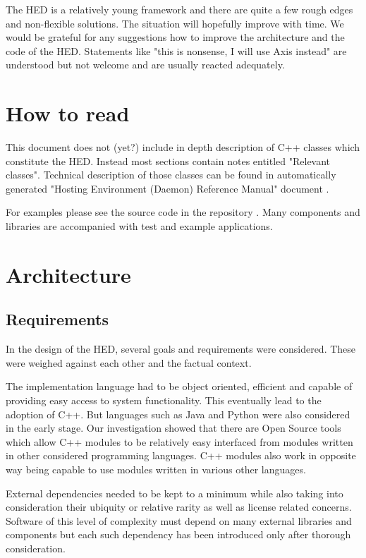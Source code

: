 \documentclass{book}
\begin{document}
The HED is a relatively young framework and there are quite a few rough edges and non-flexible solutions. The situation will hopefully improve with time. We would be grateful for any suggestions how to improve the architecture and the code of the HED. 
Statements like "this is nonsense, I will use Axis instead" are understood but not welcome and are usually reacted adequately.

\chapter{How to read}

This document does not (yet?) include in depth description of C++ classes which constitute the HED. Instead most sections contain notes entitled "Relevant classes". Technical description of those classes can be found in automatically generated "Hosting Environment (Daemon) Reference Manual" document \cite{hed-api}.

For examples please see the source code in the repository \cite{svn-arc1}. Many components and libraries are accompanied with test and example applications.


\chapter{Architecture}

\section{Requirements}
In the design of the HED, several goals and requirements were considered. These were weighed against each other and the factual context.

The implementation language had to be object oriented, efficient and capable of providing easy access to system functionality. This eventually lead to the adoption of C++. But languages such as Java and Python were also considered in the early stage.
Our investigation showed that there are Open Source tools which allow C++ modules to be relatively easy interfaced from modules written in other considered programming languages. C++ modules also work in opposite way being capable to use modules written in various other languages.

External dependencies needed to be kept to a minimum while also taking into consideration their ubiquity or relative rarity as well as license related concerns. Software of this level of complexity must depend on many external libraries and components but each such dependency has been introduced only after thorough consideration.
\end{document}
